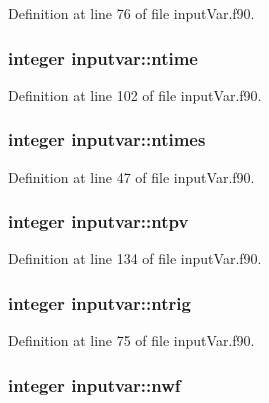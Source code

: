 Definition at line 76 of file input\-Var.\-f90.

\hypertarget{classinputvar_a30d8dd7bcf1952df019939f8ad23b6e2}{
\subsubsection[{ntime}]{\setlength{\rightskip}{0pt plus 5cm}integer inputvar\-::ntime}}\label{classinputvar_a30d8dd7bcf1952df019939f8ad23b6e2}


Definition at line 102 of file input\-Var.\-f90.

\hypertarget{classinputvar_a98d384e0347fb055110c18572dbdb522}{
\subsubsection[{ntimes}]{\setlength{\rightskip}{0pt plus 5cm}integer inputvar\-::ntimes}}\label{classinputvar_a98d384e0347fb055110c18572dbdb522}


Definition at line 47 of file input\-Var.\-f90.

\hypertarget{classinputvar_a7aec6c8c1bc131db50a1a7e65f8b0977}{
\subsubsection[{ntpv}]{\setlength{\rightskip}{0pt plus 5cm}integer inputvar\-::ntpv}}\label{classinputvar_a7aec6c8c1bc131db50a1a7e65f8b0977}


Definition at line 134 of file input\-Var.\-f90.

\hypertarget{classinputvar_ae4403f5c5b16bf2cbd2b607a87e5ee9a}{
\subsubsection[{ntrig}]{\setlength{\rightskip}{0pt plus 5cm}integer inputvar\-::ntrig}}\label{classinputvar_ae4403f5c5b16bf2cbd2b607a87e5ee9a}


Definition at line 75 of file input\-Var.\-f90.

\hypertarget{classinputvar_a1da1d97ed067b07a4a7717bffd2552ee}{
\subsubsection[{nwf}]{\setlength{\rightskip}{0pt plus 5cm}integer inputvar\-::nwf}}\label{classinputvar_a1da1d97ed067b07a4a7717bffd2552ee}


